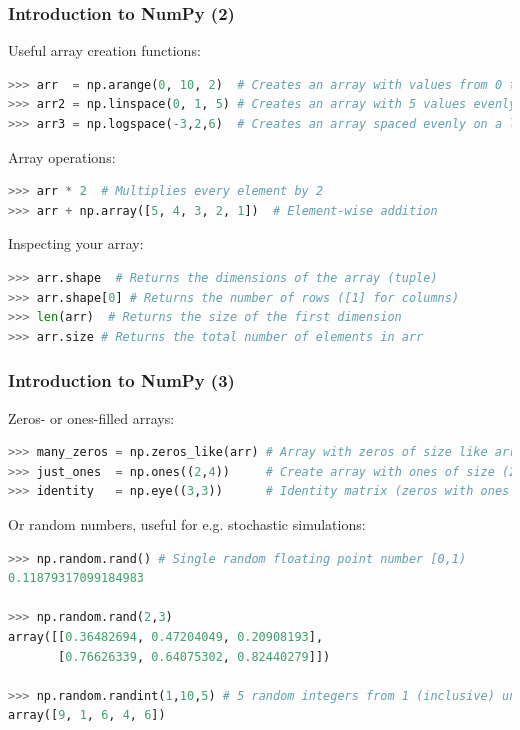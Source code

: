 \begin{frame}[fragile]
  \frametitle{Introduction to NumPy (2)}
  Useful array creation functions:
  \begin{lstlisting}[language=Python, numbers=none]
>>> arr  = np.arange(0, 10, 2)  # Creates an array with values from 0 to 10, step 2
>>> arr2 = np.linspace(0, 1, 5) # Creates an array with 5 values evenly spaced between 0 and 1
>>> arr3 = np.logspace(-3,2,6)  # Creates an array spaced evenly on a logscale
  \end{lstlisting}\pause

  Array operations:
  \begin{lstlisting}[language=Python, numbers=none]
>>> arr * 2  # Multiplies every element by 2
>>> arr + np.array([5, 4, 3, 2, 1])  # Element-wise addition
  \end{lstlisting}\pause
  
  Inspecting your array:
  \begin{lstlisting}[language=Python, numbers=none]
>>> arr.shape  # Returns the dimensions of the array (tuple)
>>> arr.shape[0] # Returns the number of rows ([1] for columns)
>>> len(arr)  # Returns the size of the first dimension
>>> arr.size # Returns the total number of elements in arr
  \end{lstlisting}
\end{frame}

\begin{frame}[fragile]
  \frametitle{Introduction to NumPy (3)}
  Zeros- or ones-filled arrays:
  \begin{lstlisting}[language=Python, numbers=none]
>>> many_zeros = np.zeros_like(arr) # Array with zeros of size like arr (also: np.zeros)
>>> just_ones  = np.ones((2,4))     # Create array with ones of size (2,4) (also: np.ones_like)
>>> identity   = np.eye((3,3))      # Identity matrix (zeros with ones on the main diagonal)
    \end{lstlisting}\pause
      
    Or random numbers, useful for e.g. stochastic simulations:
    \begin{lstlisting}[language=Python, numbers=none]
>>> np.random.rand() # Single random floating point number [0,1)
0.11879317099184983

>>> np.random.rand(2,3)
array([[0.36482694, 0.47204049, 0.20908193],
       [0.76626339, 0.64075302, 0.82440279]])

>>> np.random.randint(1,10,5) # 5 random integers from 1 (inclusive) until 10 (exclusive)
array([9, 1, 6, 4, 6])
        \end{lstlisting}\pause
\end{frame}

